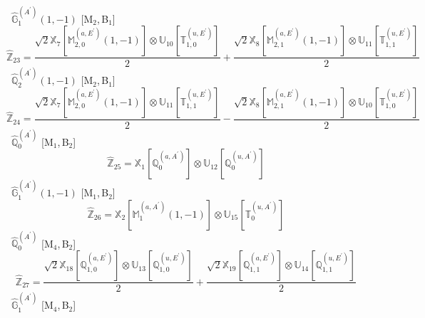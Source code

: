 \documentclass[fleqn,10pt,landscape]{article}
\begin{document}
\begin{itemize}
\begin{dmath*}
\end{dmath*}
\vspace{4mm}
\noindent {} $\,\,\,\hat{\mathbb{G}}_{1}^{(A^{\prime})}(1,-1)$ [M$_{2}$,\,B$_{1}$]
\begin{dmath*}
\hat{\mathbb{Z}}_{23}=\frac{\sqrt{2} \mathbb{X}_{7}[\mathbb{M}_{2,0}^{(a,E^{\prime})}(1,-1)] \otimes\mathbb{U}_{10}[\mathbb{T}_{1,0}^{(u,E^{\prime})}]}{2} + \frac{\sqrt{2} \mathbb{X}_{8}[\mathbb{M}_{2,1}^{(a,E^{\prime})}(1,-1)] \otimes\mathbb{U}_{11}[\mathbb{T}_{1,1}^{(u,E^{\prime})}]}{2}
\end{dmath*}
\vspace{4mm}
\noindent {} $\,\,\,\hat{\mathbb{Q}}_{2}^{(A^{\prime})}(1,-1)$ [M$_{2}$,\,B$_{1}$]
\begin{dmath*}
\hat{\mathbb{Z}}_{24}=\frac{\sqrt{2} \mathbb{X}_{7}[\mathbb{M}_{2,0}^{(a,E^{\prime})}(1,-1)] \otimes\mathbb{U}_{11}[\mathbb{T}_{1,1}^{(u,E^{\prime})}]}{2} - \frac{\sqrt{2} \mathbb{X}_{8}[\mathbb{M}_{2,1}^{(a,E^{\prime})}(1,-1)] \otimes\mathbb{U}_{10}[\mathbb{T}_{1,0}^{(u,E^{\prime})}]}{2}
\end{dmath*}
\vspace{4mm}
\noindent {} $\,\,\,\hat{\mathbb{Q}}_{0}^{(A^{\prime})}$ [M$_{1}$,\,B$_{2}$]
\begin{dmath*}
\hat{\mathbb{Z}}_{25}=\mathbb{X}_{1}[\mathbb{Q}_{0}^{(a,A^{\prime})}] \otimes\mathbb{U}_{12}[\mathbb{Q}_{0}^{(u,A^{\prime})}]
\end{dmath*}
\vspace{4mm}
\noindent {} $\,\,\,\hat{\mathbb{G}}_{1}^{(A^{\prime})}(1,-1)$ [M$_{1}$,\,B$_{2}$]
\begin{dmath*}
\hat{\mathbb{Z}}_{26}=\mathbb{X}_{2}[\mathbb{M}_{1}^{(a,A^{\prime})}(1,-1)] \otimes\mathbb{U}_{15}[\mathbb{T}_{0}^{(u,A^{\prime})}]
\end{dmath*}
\vspace{4mm}
\noindent {} $\,\,\,\hat{\mathbb{Q}}_{0}^{(A^{\prime})}$ [M$_{4}$,\,B$_{2}$]
\begin{dmath*}
\hat{\mathbb{Z}}_{27}=\frac{\sqrt{2} \mathbb{X}_{18}[\mathbb{Q}_{1,0}^{(a,E^{\prime})}] \otimes\mathbb{U}_{13}[\mathbb{Q}_{1,0}^{(u,E^{\prime})}]}{2} + \frac{\sqrt{2} \mathbb{X}_{19}[\mathbb{Q}_{1,1}^{(a,E^{\prime})}] \otimes\mathbb{U}_{14}[\mathbb{Q}_{1,1}^{(u,E^{\prime})}]}{2}
\end{dmath*}
\vspace{4mm}
\noindent {} $\,\,\,\hat{\mathbb{G}}_{1}^{(A^{\prime})}$ [M$_{4}$,\,B$_{2}$]
\begin{dmath*}

\end{dmath*}
\end{itemize}
\end{document}
